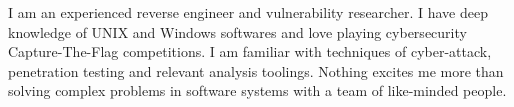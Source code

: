 

\begin{cvparagraph}

I am an experienced reverse engineer and vulnerability researcher. I have deep knowledge of UNIX and Windows softwares and love playing cybersecurity Capture-The-Flag competitions. I am familiar with techniques of cyber-attack, penetration testing and relevant analysis toolings. Nothing excites me more than solving complex problems in software systems with a team of like-minded people.
\end{cvparagraph}
